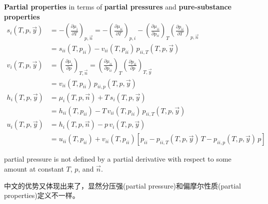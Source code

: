 \begin{defn}
    \textbf{Partial properties} in terms of \textbf{partial pressures} and \textbf{pure-substance properties}
    \begin{align*}
        s_i(T, p, \vec{y}) &= - \left( \frac{\partial \mu_i}{\partial T} \right)_{p, \vec{n}} 
        = - \left( \frac{\partial \mu_{ii}}{\partial T} \right)_{p, i} 
        - \left( \frac{\partial \mu_{ii}}{\partial p_{ii}} \right)_T 
        \left( \frac{\partial p_{ii}}{\partial T} \right)_{p, \vec{n}} \\
        &= s_{ii}(T, p_{ii}) - v_{ii}(T, p_{ii}) \, p_{ii,T}(T, p, \vec{y}) 
    \\
        v_i(T, p, \vec{y}) &= \left( \frac{\partial \mu_i}{\partial p} \right)_{T, \vec{n}} 
        = \left( \frac{\partial \mu_{ii}}{\partial p_{ii}} \right)_T
        \left( \frac{\partial p_{ii}}{\partial p} \right)_{T, \vec{y}} \\
        &= v_{ii}(T, p_{ii}) \, p_{ii,p}(T, p, \vec{y})
    \\
        h_i(T, p, \vec{y}) &= \mu_i(T, p, \vec{n}) + T \, s_i(T, p, \vec{y}) \\
        &= h_{ii}(T, p_{ii}) - T \, v_{ii}(T, p_{ii}) \, p_{ii,T}(T, p, \vec{y})
    \\
        u_i(T, p, \vec{y}) &= h_i(T, p, \vec{n}) - p \, v_i(T, p, \vec{y}) \\
        &= u_{ii}(T, p_{ii}) + v_{ii}(T, p_{ii}) 
        \left[ p_{ii} - p_{ii,T}(T, p, \vec{y}) \, T - p_{ii,p}(T, p, \vec{y}) \, p \right]
    \end{align*}
    \begin{zhu}
        partial pressure is not defined by a partial derivative 
        with respect to some amount at constant \(T\), \(p\), and \(\vec{n}\).

        中文的优势又体现出来了，显然分压强(partial pressure)和偏摩尔性质(partial properties)定义不一样。
    \end{zhu}
\end{defn}
